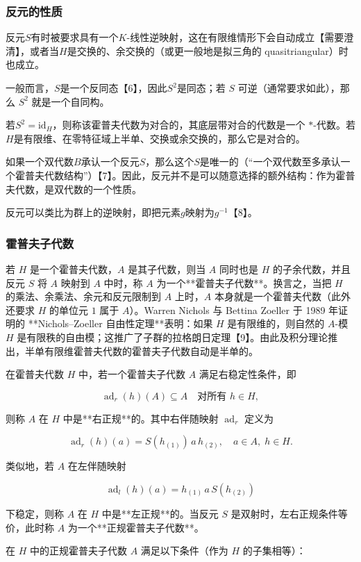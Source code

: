 \subsubsection{反元的性质}
反元$S$有时被要求具有一个$K$-线性逆映射，这在有限维情形下会自动成立【需要澄清】，或者当$H$是交换的、余交换的（或更一般地是拟三角的 quasitriangular）时也成立。

一般而言，$S$是一个反同态【6】，因此$S^2$是同态；若 $S$ 可逆（通常要求如此），那么 $S^2$ 就是一个自同构。

若$S^2 = \mathrm{id}_H$，则称该霍普夫代数为对合的，其底层带对合的代数是一个 $*$-代数。若$H$是有限维、在零特征域上半单、交换或余交换的，那么它是对合的。

如果一个双代数$B$承认一个反元$S$，那么这个$S$是唯一的（“一个双代数至多承认一个霍普夫代数结构”）【7】。因此，反元并不是可以随意选择的额外结构：作为霍普夫代数，是双代数的一个性质。

反元可以类比为群上的逆映射，即把元素$g$映射为$g^{-1}$【8】。
\subsubsection{霍普夫子代数}
若 $H$ 是一个霍普夫代数，$A$ 是其子代数，则当 $A$ 同时也是 $H$ 的子余代数，并且反元 $S$ 将 $A$ 映射到 $A$ 中时，称 $A$ 为一个**霍普夫子代数**。换言之，当把 $H$ 的乘法、余乘法、余元和反元限制到 $A$ 上时，$A$ 本身就是一个霍普夫代数（此外还要求 $H$ 的单位元 $1$ 属于 $A$）。Warren Nichols 与 Bettina Zoeller 于 1989 年证明的 **Nichols–Zoeller 自由性定理**表明：如果 $H$ 是有限维的，则自然的 $A$-模 $H$ 是有限秩的自由模；这推广了子群的拉格朗日定理【9】。由此及积分理论推出，半单有限维霍普夫代数的霍普夫子代数自动是半单的。

在霍普夫代数 $H$ 中，若一个霍普夫子代数 $A$ 满足右稳定性条件，即

$$
\operatorname{ad}_r(h)(A) \subseteq A \quad \text{对所有 } h \in H,
$$

则称 $A$ 在 $H$ 中是**右正规**的。其中右伴随映射 $\operatorname{ad}_r$ 定义为

$$
\operatorname{ad}_r(h)(a) = S(h_{(1)})\, a \, h_{(2)}, \quad a \in A, \; h \in H.
$$

类似地，若 $A$ 在左伴随映射

$$
\operatorname{ad}_l(h)(a) = h_{(1)}\, a \, S(h_{(2)})
$$

下稳定，则称 $A$ 在 $H$ 中是**左正规**的。当反元 $S$ 是双射时，左右正规条件等价，此时称 $A$ 为一个**正规霍普夫子代数**。

在 $H$ 中的正规霍普夫子代数 $A$ 满足以下条件（作为 $H$ 的子集相等）：

